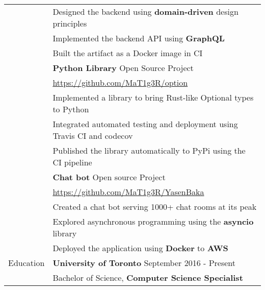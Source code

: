 \documentclass[letterpaper,12pt,oneside]{article}
\newcommand{\smallurl}[1]{\scriptsize{\url{#1}}}
\newcommand{\tabitem}{\hspace{0.2cm}\textbullet\hspace{0.2cm}}
\begin{document}
\begin{longtable}{@{} l p{14cm}}
& \tabitem
Designed the backend using \textbf{domain-driven} design principles \\
& \tabitem
Implemented the backend API using \textbf{GraphQL} \\
& \tabitem Built the artifact as a Docker image in CI \\
& \textbf{Python Library}\hspace*{\fill} Open Source Project \\
& \smallurl{https://github.com/MaT1g3R/option} \\
& \tabitem
Implemented a library to bring Rust-like Optional types to Python \\
& \tabitem
Integrated automated testing and deployment using Travis CI and codecov \\
& \tabitem Published the library automatically to PyPi using the CI pipeline \\
& \textbf{Chat bot}\hspace*{\fill} Open source Project \\
& \smallurl{https://github.com/MaT1g3R/YasenBaka} \\
& \tabitem
Created a chat bot serving 1000+ chat rooms at its peak \\
& \tabitem
Explored asynchronous programming using the \textbf{asyncio} library \\
& \tabitem
Deployed the application using \textbf{Docker} to \textbf{AWS} \\
\Large{Education}
& \textbf{University of Toronto} \hspace*{\fill} September 2016 - Present\\
& \tabitem
Bachelor of Science, \textbf{Computer Science Specialist} \\
\end{longtable}
\end{document}
